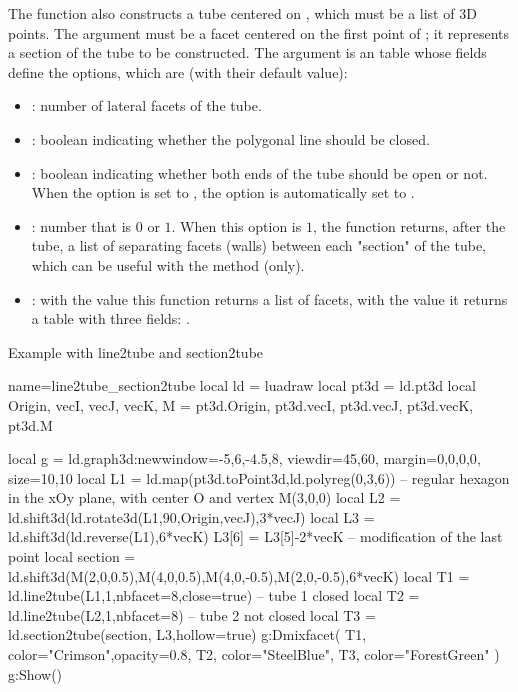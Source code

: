 The function  also constructs a tube centered on , which must be a list of 3D points. The argument  must be a facet centered on the first point of ; it represents a section of the tube to be constructed. The argument  is an table whose fields define the options, which are (with their default value):
\begin{itemize}
    \item {}: number of lateral facets of the tube.
    
    \item {}: boolean indicating whether the polygonal line should be closed.
    
    \item {}: boolean indicating whether both ends of the tube should be open or not. When the  option is set to \true, the  option is automatically set to \true.   
        
    \item {}: number that is $0$ or $1$. When this option is $1$, the function returns, after the tube, a list of separating facets (walls) between each "section" of the tube, which can be useful with the  method (only).
    
    \item {} : with the value \false this function returns a list of facets, with the value \true it returns a table with three fields: . 
\end{itemize}

\begin{demo}{Example with line2tube and section2tube}
\begin{luadraw}{name=line2tube_section2tube}
local ld = luadraw
local pt3d = ld.pt3d
local Origin, vecI, vecJ, vecK, M = pt3d.Origin, pt3d.vecI, pt3d.vecJ, pt3d.vecK, pt3d.M

local g = ld.graph3d:new{window={-5,6,-4.5,8}, viewdir={45,60}, margin={0,0,0,0}, size={10,10}}
local L1 = ld.map(pt3d.toPoint3d,ld.polyreg(0,3,6)) -- regular hexagon in the xOy plane, with center O and vertex M(3,0,0)
local L2 = ld.shift3d(ld.rotate3d(L1,90,{Origin,vecJ}),3*vecJ)
local L3 = ld.shift3d(ld.reverse(L1),6*vecK)
L3[6] = L3[5]-2*vecK -- modification of the last point
local section = ld.shift3d({M(2,0,0.5),M(4,0,0.5),M(4,0,-0.5),M(2,0,-0.5)},6*vecK)
local T1 = ld.line2tube(L1,1,{nbfacet=8,close=true}) -- tube 1 closed
local T2 = ld.line2tube(L2,1,{nbfacet=8}) -- tube 2 not closed
local T3 = ld.section2tube(section, L3,{hollow=true})
g:Dmixfacet( T1, {color="Crimson",opacity=0.8}, T2, {color="SteelBlue"}, T3, {color="ForestGreen"} )
g:Show()
\end{luadraw}
\end{demo}

